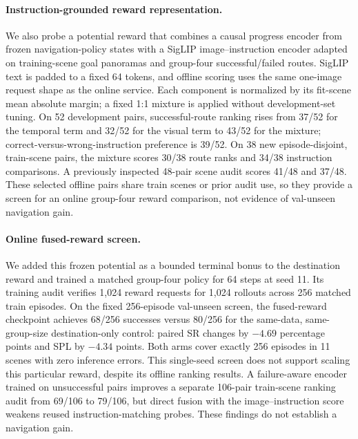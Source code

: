 \documentclass[10pt,twocolumn,letterpaper]{article}
\begin{document}
\paragraph{Instruction-grounded reward representation.} We also probe a
potential reward that combines a causal progress encoder from frozen
navigation-policy states with a SigLIP image--instruction encoder adapted
on training-scene goal panoramas and group-four successful/failed routes.
SigLIP text is padded to a fixed 64 tokens, and offline scoring uses
the same one-image request shape as the online service. Each component
is normalized by its fit-scene mean absolute margin; a fixed 1:1
mixture is applied without development-set tuning. On 52
development pairs, successful-route ranking rises from 37/52 for the
temporal term and 32/52 for the visual term to 43/52 for the mixture;
correct-versus-wrong-instruction preference is 39/52. On 38 new
episode-disjoint, train-scene pairs, the mixture scores 30/38 route ranks
and 34/38 instruction comparisons. A previously inspected 48-pair scene
audit scores 41/48 and 37/48. These selected offline pairs share train
scenes or prior audit use, so they provide a screen for an online
group-four reward comparison, not evidence of val-unseen navigation gain.

\paragraph{Online fused-reward screen.} We added this frozen potential as
a bounded terminal bonus to the destination reward and trained a matched
group-four policy for 64 steps at seed 11. Its training audit verifies
1,024 reward requests for 1,024 rollouts across 256 matched train episodes.
On the fixed 256-episode val-unseen screen, the fused-reward checkpoint
achieves 68/256 successes versus 80/256 for the same-data,
same-group-size destination-only control: paired SR changes by $-4.69$
percentage points and SPL by $-4.34$ points. Both arms cover exactly 256
episodes in 11 scenes with zero inference errors. This single-seed screen
does not support scaling this particular reward, despite its offline
ranking results. A failure-aware encoder trained on unsuccessful pairs
improves a separate 106-pair train-scene ranking audit from 69/106 to
79/106, but direct fusion with the image--instruction score weakens
reused instruction-matching probes. These findings do not establish
a navigation gain.
\end{document}
